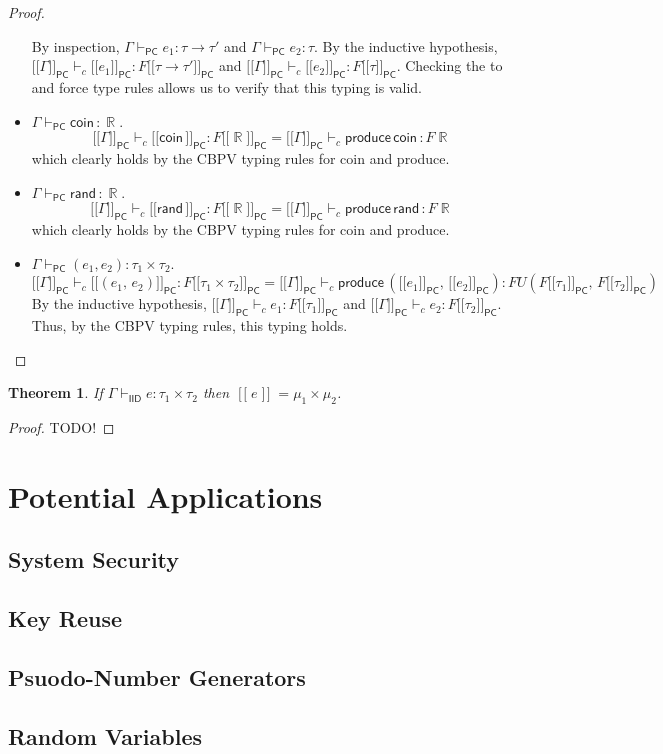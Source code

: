 \documentclass{article}
\newtheorem*{theorem}{Theorem}
\DeclareMathOperator*\R{\mathbb{R}}
\DeclareMathOperator*\llb{[\![}
\DeclareMathOperator*\rrb{]\!]}
\newcommand{\iid}{\mathsf{IID}}
\newcommand{\pc}{\mathsf{PC}}
\newcommand{\rand}{\mathsf{rand\,}}
\newcommand{\coin}{\mathsf{coin\,}}
\newcommand{\1}{\mathsf{\,\#1\,}}
\newcommand{\2}{\mathsf{\,\#2\,}}
\newcommand{\produce}{\mathsf{produce \,}}
\newcommand{\sempc}[1]{[\![ #1 {]\!]}_{\mathsf{PC}}}
\begin{document}
\begin{proof}
\begin{itemize}
\begin{equation*}
	\end{equation*}
	By inspection, $\Gamma \vdash_\pc e_1 : \tau \to \tau'$
	and 
	$\Gamma \vdash_\pc e_2 : \tau$. 
	By the inductive hypothesis,
	$\sempc{\Gamma} \vdash_c \sempc{e_1} : F \sempc{\tau \to \tau'}$
	and
	$\sempc{\Gamma} \vdash_c \sempc{e_2} : F \sempc{\tau}$.
	Checking the to and force type rules allows us to verify that this typing is valid.
	\item
	$\Gamma \vdash_\pc  \coin : \R$.
	\begin{equation*}
		\sempc{\Gamma} \vdash_c \sempc{\coin} : F \sempc{\R}
		=
		\sempc{\Gamma} 
		\vdash_c \produce \coin : F \R
	\end{equation*}
	which clearly holds by the CBPV typing rules for coin and produce.
	\item
	$\Gamma \vdash_\pc  \rand : \R$.
	\begin{equation*}
		\sempc{\Gamma} \vdash_c \sempc{\rand} : F \sempc{\R}
		=
		\sempc{\Gamma} 
		\vdash_c \produce \rand : F \R
	\end{equation*}
	which clearly holds by the CBPV typing rules for coin and produce.
	\item
	$\Gamma \vdash_\pc  (e_1, e_2) : \tau_1 \times \tau_2$.
	\begin{equation*}
		\sempc{\Gamma} \vdash_c \sempc{(e_1,\, e_2)}: F \sempc{\tau_1 \times \tau_2}
		=
		\sempc{\Gamma} 
		\vdash_c \produce (\sempc{e_1},\, \sempc{e_2}) : 
		F U (F \sempc{\tau_1},\, F \sempc{\tau_2})
	\end{equation*}
	By the inductive hypothesis,
	$\sempc{\Gamma} \vdash_c e_1 : F \sempc{\tau_1}$
	and
	$\sempc{\Gamma} \vdash_c e_2 : F \sempc{\tau_2}$.
	Thus, by the CBPV typing rules, this typing holds.
\end{itemize}
\end{proof}

\begin{theorem}
	If $\Gamma \vdash_{\iid} e : \tau_1 \times \tau_2$
	then $\llb e \rrb = \mu_1 \times \mu_2$.
\end{theorem}

\begin{proof}
TODO!
\end{proof}

\section{Potential Applications}
	\subsection{System Security}
	\subsection{Key Reuse}
	
	\subsection{Psuodo-Number Generators}
	
	\subsection{Random Variables}
\end{document}
